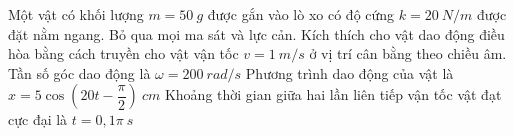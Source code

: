 \begin{ex}
	Một vật có khối lượng $m=50 \ g$ được gắn vào lò xo có độ cứng $k=20 \ N/m$ được đặt nằm ngang. Bỏ qua mọi ma sát và lực cản. Kích thích cho vật dao động điều hòa bằng cách truyền cho vật vận tốc $v=1 \ m/s$ ở vị trí cân bằng theo chiều âm.
	{Tần số góc dao động là $\omega=200\ rad/s$}
	{Phương trình dao động của vật là $x=5 \cos (20 t-\dfrac{\pi}{2})\ cm$}
	{\True Khoảng thời gian giữa hai lần liên tiếp vận tốc vật đạt cực đại là $t=0,1\pi\ s$}
\end{ex}
